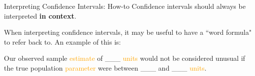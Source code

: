 \documentclass[10pt,t]{beamer}
\begin{document}
%
%
%
%
%
%

\begin{frame}{Interpreting Confidence Intervals: How-to}
Confidence intervals should always be interpreted \textbf{in context}.

\vspace{0.3cm}

When interpreting confidence intervals, it may be useful to have a ``word formula" to refer back to. An example of this is:

\vspace{0.3cm}

Our observed sample \textcolor{orange}{estimate} of \_\_\_ \textcolor{orange}{units} would not be considered unusual if the true population \textcolor{orange}{parameter} were between \_\_\_ and \_\_\_ \textcolor{orange}{units}.

\end{frame}
\end{document}
